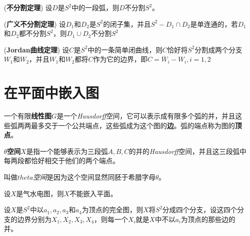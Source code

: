 \begin{mdframed}
    \begin{theorem}
        (\textbf{不分割定理}) 设$D$是$S^2$中的一段弧，则$D$不分割$S^2$。
    \end{theorem}
\end{mdframed}

\begin{mdframed}
    \begin{theorem}
        (\textbf{广义不分割定理}) 设$D_1$和$D_2$是$S^2$的闭子集，并且$S^2-D_1\cap D_2$是单连通的，若$D_1$和$D_2$都不分割$S^2$，则$D_1\cup D_2$不分割$S^2$
    \end{theorem}
\end{mdframed}

\begin{mdframed}
    \begin{theorem}
        (\textbf{Jordan曲线定理}) 设$C$是$S^2$中的一条简单闭曲线，则$C$恰好将$S^2$分割成两个分支$W_1$和$W_2$，并且$W_1$和$W_2$都将$C$作为它的边界，即$C=\overline{W}_i-W_i,i=1,2$ 
    \end{theorem}
\end{mdframed}

\section{在平面中嵌入图}

一个有限\textbf{线性图}$G$是一个\textsl{Hausdorff}空间，它可以表示成有限多个弧的并，并且这些弧两两最多交于一个公共端点，这些弧成为这个图的\textbf{边}。弧的端点称为图的\textbf{顶点}。

\vspace*{1em}

\begin{define}
    \textbf{$\theta$空间}$X$是指一个能够表示为三段弧$A,B,C$的并的\textsl{Hausdorff}空间，并且这三段弧中每两段都恰好相交于他们的两个端点。
\end{define}

\vspace*{1em}

叫做\textsl{$theta$空间}是因为这个空间显然同胚于希腊字母$\theta$。

\begin{mdframed}
    \begin{theorem}
        设$X$是气水电图，则$X$不能嵌入平面。
    \end{theorem}
\end{mdframed}

\begin{mdframed}
    \begin{lemma}
        设$X$是$S^2$中以$a_1,a_2,a_3$和$a_4$为顶点的完全图，则$X$将$S^2$分成四个分支，设这四个分支的边界分别为$X_1,X_2,X_3,X_4$，则每一个$X_i$就是$X$中不以$a_i$为顶点的那些边的并。
    \end{lemma}
\end{mdframed}

